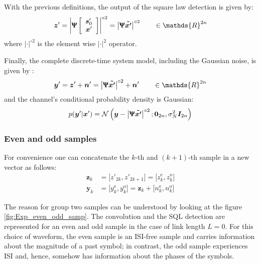 With the previous definitions, the output of the square law detection is given by:
\begin{align*}
	\bm z' = \left|\bm \Uppsi \left[
\begin{array}{c}
\bm{s}'_0  \\
   \bm x'
\end{array}
\right]
\right|^{\circ2} = \left|\bm{ \Uppsi \tilde{x'}}\right|^{\circ2} \qquad \in\mathds{R}^{2n}
\end{align*}
where $|\cdot|^{\circ2}$ is the element wise $|\cdot|^2$ operator.

Finally, the complete discrete-time system model, including the Gaussian noise, is given by \cite{Plabst_DD}:
\begin{align*}
	\bm y' = \bm z' + \bm n' = \left|\bm{ \Uppsi \tilde{x'}}\right|^{\circ2} +\bm n' \qquad \in \mathds{R}^{2n}
\end{align*}
and the channel’s conditional probability density is Gaussian\cite{Plabst_DD}:
\begin{equation}
p(\bm y'|\bm x')=\mathcal N \left( \bm y- \left|\bm{ \Uppsi \tilde{x'}}\right|^{\circ2}; \bm 0_{2n} , \sigma_N^2 \bm I_{2n}  \right)
\end{equation}


\subsubsection{Even and odd samples}

For convenience one can concatenate the $k$-th and $(k+1)$-th sample in a new vector as follows:
\begin{align}
\bm z_k&= \bigl[z'_{2k},z'_{2k+1}\bigr]=\bigl[z_{k}^{\text{e}},z_{k}^{\text{o}}\bigr]
\label{eq:z_even_odd}\\
\bm y_k&=\bigl[y_{k}^{\text{e}},y_{k}^{\text{o}}\bigr]=\bm z_k+\bigl[n_{k}^{\text{e}}, n_{k}^{\text{o}}\bigr]
\label{eq:y_even_odd}
\end{align}

The reason for group two samples can be understood by looking at the figure \ref{fig:Exp_even_odd_samp}. The convolution and the SQL detection are represented for an even and odd sample in the case of link length $L=0$. For this choice of waveform, the even sample is an ISI-free sample and carries information about the magnitude of a past symbol; in contrast, the odd sample experiences ISI and, hence, somehow has information about the phases of the symbols.  


